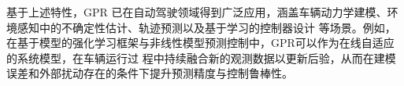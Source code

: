 基于上述特性，GPR 已在自动驾驶领域得到广泛应用，涵盖车辆动力学建模、环境感知中的不确定性估计、轨迹预测以及基于学习的控制器设计
等场景。例如，在基于模型的强化学习框架与非线性模型预测控制中，GPR可以作为在线自适应的系统模型，在车辆运行过
程中持续融合新的观测数据以更新后验，从而在建模误差和外部扰动存在的条件下提升预测精度与控制鲁棒性。
